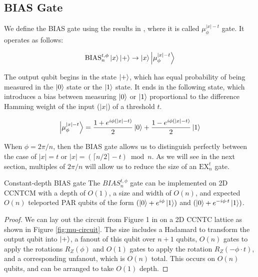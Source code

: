 \subsection{BIAS Gate}
\label{subsec:mu-gate}

We define the BIAS gate using the results in \cite{Hoyer2002}, where it is called $\mu^{|x|-t}_{\phi}$ gate.
It operates as follows:

\begin{equation}
\text{BIAS}^{t,\phi}_n\left\vert{x}\right\rangle\left\vert{+}\right\rangle \rightarrow \left\vert{x}\right\rangle\left\vert{\mu^{|x|-t}_{\phi}}\right\rangle
\end{equation}

The output qubit begins in the state $\left\vert{+}\right\rangle$, which has equal probability of
being measured in the $\left\vert{0}\right\rangle$ state or the $\left\vert{1}\right\rangle$ state. It ends in
the following state, which introduces a bias between measuring $\left\vert{0}\right\rangle$
or $\left\vert{1}\right\rangle$ proportional to the difference Hamming weight of the input
($|x|$) of a threshold $t$.

\begin{equation}
\left\vert{\mu^{|x|-t}_{\phi}}\right\rangle = \frac{1 + e^{i\phi(|x|-t)}}{2}\left\vert{0}\right\rangle + \frac{1 - e^{i\phi(|x|-t)}}{2}\left\vert{1}\right\rangle
\end{equation}

When $\phi = 2\pi / n$, then the BIAS gate allows us to distinguish perfectly
between the case of $|x| = t$ or $|x| = (\lceil n/2 \rceil - t) \bmod n$. As we will
see in the next section, multiples of $2\pi / n$ will allow us to reduce the
size of an $\text{EX}^t_n$ gate.

\begin{theorem}{Constant-depth BIAS gate}
The $BIAS^{t,\phi}_n$ gate can be implemented on 2D CCNTCM with
a depth of $O(1)$, a size and width of $O(n)$, and
expected $O(n)$ teleported PAR qubits of the form $(\left\vert{0}\right\rangle + e^{i\phi}\left\vert{1}\right\rangle)$
and $(\left\vert{0}\right\rangle + e^{-i\phi\cdot t}\left\vert{1}\right\rangle)$.
\label{thm:bias}
\end{theorem}

\begin{proof}
We can lay out the circuit from Figure 1 in \cite{Takahashi2011} on a 2D CCNTC lattice as
shown in Figure \ref{fig:mu-circuit}. The size includes a Hadamard to transform
the output qubit into $\left\vert{+}\right\rangle$, a fanout of this qubit over $n+1$ qubits,
$O(n)$ gates to apply the rotations $R_Z(\phi)$ and $O(1)$ gates to apply
the rotation $R_Z(-\phi\cdot t)$, and a corresponding unfanout, which is
$O(n)$ total. This occurs on $O(n)$ qubits, and can be arranged to take
$O(1)$ depth.
\end{proof}

